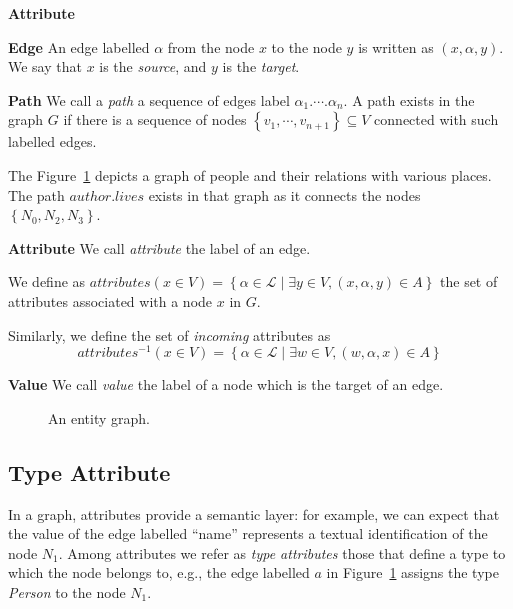 \begin{labeling}{\textbf{Attribute}}
	\item[\textbf{Edge}] An edge labelled $\alpha$ from the node $x$ to the node $y$ is written as $\left(x, \alpha, y\right)$. We say that $x$ is the \emph{source}, and $y$ is the \emph{target}.

	\item[\textbf{Path}] We call a \emph{path} a sequence of edges label $\alpha_1.\cdots.\alpha_n$. A path exists in the graph $G$ if there is a sequence of nodes $\left\lbrace v_1, \cdots, v_{n+1} \right\rbrace \subseteq V$ connected with such labelled edges.
	
	The Figure~\ref{fig:graph} depicts a graph of people and their relations with various places. The path $author.lives$ exists in that graph as it connects the nodes $\left\lbrace N_0, N_2, N_3 \right\rbrace$.

	\item[\textbf{Attribute}] We call \emph{attribute} the label of an edge.
	
	We define as $attributes\left(x \in V\right) = \left\lbrace \alpha \in \mathcal{L} \mid \exists y \in V, (x, \alpha, y) \in A \right\rbrace$ the set of attributes associated with a node $x$ in $G$.
	
	Similarly, we define the set of \emph{incoming} attributes as
	$$
	attributes^{-1}\left(x \in V\right) = \left\lbrace \alpha \in \mathcal{L} \mid \exists w \in V, (w, \alpha, x) \in A \right\rbrace
	$$
	\item[\textbf{Value}] We call \emph{value} the label of a node which is the target of an edge.
\end{labeling}

\begin{figure}
	\centering
	\resizebox{\textwidth}{!}{
		
	}
	\caption{An entity graph.}
	\label{fig:graph}
\end{figure}

\subsection{Type Attribute}

In a graph, attributes provide a semantic layer: for example, we can expect that the value of the edge labelled ``name'' represents a textual identification of the node $N_1$. Among attributes we refer as \emph{type attributes} those that define a type to which the node belongs to, e.g., the edge labelled $a$ in Figure~\ref{fig:graph} assigns the type \emph{Person} to the node $N_1$.

